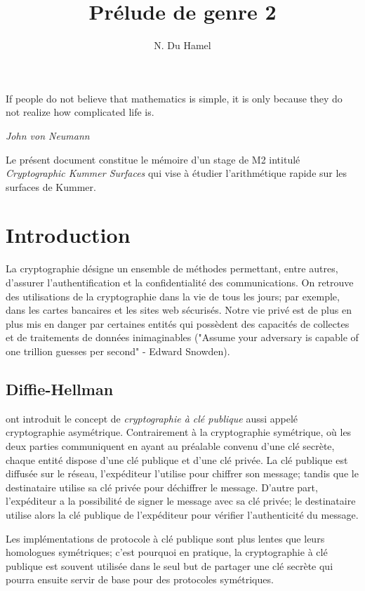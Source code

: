 \documentclass[a4paper]{article}
\theoremstyle{definition}
\theoremstyle{remark}
\numberwithin{equation}{section}
\begin{document}
\title{Prélude de genre 2}
\author{N. Du Hamel}
\maketitle

\epigraph{If people do not believe that mathematics is simple, it is only because they do not realize how complicated life is.}{\textit{John von Neumann}}

Le présent document constitue le mémoire d'un stage de M2 intitulé \emph{Cryptographic Kummer Surfaces} qui vise à étudier l'arithmétique rapide sur les surfaces de Kummer.

\section{Introduction}

La cryptographie désigne un ensemble de méthodes permettant, entre autres, d'assurer l'authentification et la confidentialité des communications. On retrouve des utilisations de la cryptographie dans la vie de tous les jours; par exemple, dans les cartes bancaires et les sites web sécurisés. Notre vie privé est de plus en plus mis en danger par certaines entités qui possèdent des capacités de collectes et de traitements de données inimaginables ("Assume your adversary is capable of one trillion guesses per second" - Edward Snowden).

\subsection{Diffie-Hellman}
\cite{diffie-hellman} ont introduit le concept de \emph{cryptographie à clé publique} aussi appelé cryptographie asymétrique. Contrairement à la cryptographie symétrique, où les deux parties communiquent en ayant au préalable convenu d'une clé secrète, chaque entité dispose d'une clé publique et d'une clé privée. La clé publique est diffusée sur le réseau, l'expéditeur l'utilise pour chiffrer son message; tandis que le destinataire utilise sa clé privée pour déchiffrer le message. D'autre part, l'expéditeur a la possibilité de signer le message avec sa clé privée; le destinataire utilise alors la clé publique de l'expéditeur pour vérifier l'authenticité du message.

Les implémentations de protocole à clé publique sont plus lentes que leurs homologues symétriques; c'est pourquoi en pratique, la cryptographie à clé publique est souvent utilisée dans le seul but de partager une clé secrète qui pourra ensuite servir de base pour des protocoles symétriques.
\end{document}
